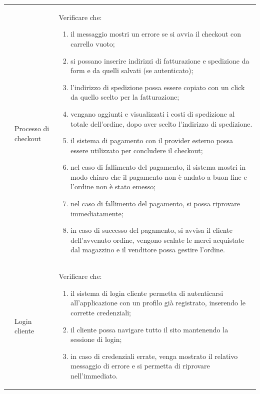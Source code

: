 \begin{center}
\begin{longtable}{|p{1cm}|p{4.85cm}|p{9cm}|}
		 & Processo di checkout & Verificare che:
		\begin{enumerate}
			\item il messaggio mostri un errore se si avvia il checkout con carrello vuoto;
			\item si possano inserire indirizzi di fatturazione e spedizione da form e da quelli salvati (se autenticato);
			\item l'indirizzo di spedizione possa essere copiato con un click da quello scelto per la fatturazione;
			\item vengano aggiunti e visualizzati i costi di spedizione al totale dell'ordine, dopo aver scelto l'indirizzo di spedizione. 
			\item il sistema di pagamento con il provider esterno possa essere utilizzato per concludere il checkout;
			\item nel caso di fallimento del pagamento, il sistema mostri in modo chiaro che il pagamento non è andato a buon fine e l'ordine non è stato emesso;
			\item nel caso di fallimento del pagamento, si possa riprovare immediatamente;
			\item in caso di successo del pagamento, si avvisa il cliente dell'avvenuto ordine, vengono scalate le merci acquistate dal magazzino e il venditore possa gestire l'ordine.
		\end{enumerate} \\

		 & Login cliente & Verificare che:
		\begin{enumerate}
			\item il sistema di login cliente permetta di autenticarsi all'applicazione con un profilo già registrato, inserendo le corrette credenziali;
			\item il cliente possa navigare tutto il sito mantenendo la sessione di login;
			\item in caso di credenziali errate, venga mostrato il relativo messaggio di errore e si permetta di riprovare nell'immediato.
		\end{enumerate} \\


\end{longtable}
\end{center}
